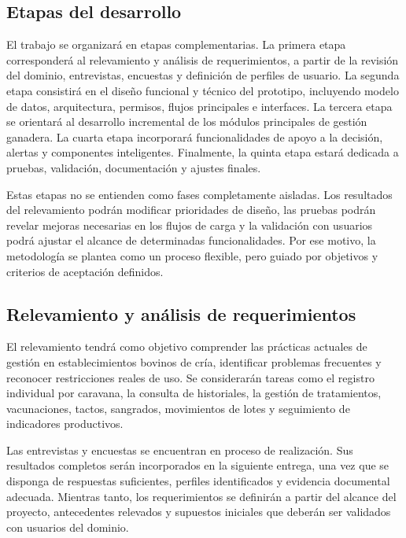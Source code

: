\subsection{Etapas del desarrollo}

El trabajo se organizar\'a en etapas complementarias. La primera etapa corresponder\'a al relevamiento y an\'alisis de requerimientos, a partir de la revisi\'on del dominio, entrevistas, encuestas y definici\'on de perfiles de usuario. La segunda etapa consistir\'a en el dise\~no funcional y t\'ecnico del prototipo, incluyendo modelo de datos, arquitectura, permisos, flujos principales e interfaces. La tercera etapa se orientar\'a al desarrollo incremental de los m\'odulos principales de gesti\'on ganadera. La cuarta etapa incorporar\'a funcionalidades de apoyo a la decisi\'on, alertas y componentes inteligentes. Finalmente, la quinta etapa estar\'a dedicada a pruebas, validaci\'on, documentaci\'on y ajustes finales.

Estas etapas no se entienden como fases completamente aisladas. Los resultados del relevamiento podr\'an modificar prioridades de dise\~no, las pruebas podr\'an revelar mejoras necesarias en los flujos de carga y la validaci\'on con usuarios podr\'a ajustar el alcance de determinadas funcionalidades. Por ese motivo, la metodolog\'ia se plantea como un proceso flexible, pero guiado por objetivos y criterios de aceptaci\'on definidos.

\subsection{Relevamiento y an\'alisis de requerimientos}

El relevamiento tendr\'a como objetivo comprender las pr\'acticas actuales de gesti\'on en establecimientos bovinos de cr\'ia, identificar problemas frecuentes y reconocer restricciones reales de uso. Se considerar\'an tareas como el registro individual por caravana, la consulta de historiales, la gesti\'on de tratamientos, vacunaciones, tactos, sangrados, movimientos de lotes y seguimiento de indicadores productivos.

Las entrevistas y encuestas se encuentran en proceso de realizaci\'on. Sus resultados completos ser\'an incorporados en la siguiente entrega, una vez que se disponga de respuestas suficientes, perfiles identificados y evidencia documental adecuada. Mientras tanto, los requerimientos se definir\'an a partir del alcance del proyecto, antecedentes relevados y supuestos iniciales que deber\'an ser validados con usuarios del dominio.

